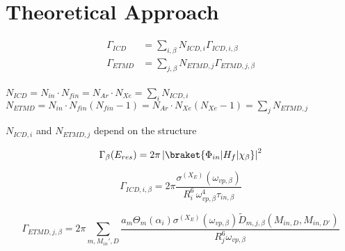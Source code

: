 \section{Theoretical Approach}

\begin{align}
 \Gamma_{ICD}  &= \sum\limits_{i,\beta} N_{ICD,i}  \Gamma_{ICD,i,\beta}\\
 \Gamma_{ETMD} &= \sum\limits_{j,\beta} N_{ETMD,j} \Gamma_{ETMD,j,\beta}\\
\end{align}

$N_{ICD} = N_{in} \cdot N_{fin} = N_{Ar} \cdot N_{Xe}
 = \sum\limits_i N_{ICD,i}$
$N_{ETMD} = N_{in} \cdot N_{fin} (N_{fin} - 1) = N_{Ar} \cdot N_{Xe} (N_{Xe} - 1)
 = \sum\limits_j N_{ETMD,j}$

$N_{ICD,i}$ and $N_{ETMD,j}$ depend on the structure

\begin{equation}
 \Gamma_{\beta}(E_{res}) = 2\pi \left|
                           \braket{\Phi_{in}| H_f |\chi_{\beta}}
                           \right|^2
\end{equation}

\begin{equation}
 \Gamma_{ICD,i,\beta} = 2\pi
                        \frac{\sigma^{(X_E)}(\omega_{vp,\beta})}
                        {R_i^6 \, \omega_{vp,\beta}^4 \tau_{in,\beta}}
\end{equation}


\begin{equation}
 \Gamma_{ETMD,j,\beta} = 2\pi \sum\limits_{m,M_{in}',D}
                        \frac{a_m \Theta_m(\alpha_i) \sigma^{(X_E)}(\omega_{vp,\beta})
                              \tilde{D}_{m,j,\beta}(M_{in,D},M_{in,D'})}
                         {R_j^6 \omega_{vp,\beta}}
\end{equation}


\begin{equation}
\end{equation}


\begin{equation}
\end{equation}


\begin{equation}
\end{equation}


\begin{equation}
\end{equation}


\begin{equation}
\end{equation}



\begin{equation}
\end{equation}


